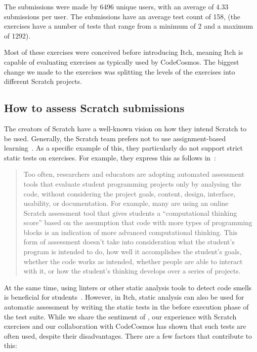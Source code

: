 \documentclass[../main]{subfiles}
\begin{document}
The submissions were made by \num{6496} unique users, with an average of \num{4.33} submissions per user.
The submissions have an average test count of \num{158}, (the exercises have a number of tests that range from a minimum of \num{2} and a maximum of \num{1292}).

Most of these exercises were conceived before introducing Itch, meaning Itch is capable of evaluating exercises as typically used by CodeCosmos.
The biggest change we made to the exercises was splitting the levels of the exercises into different Scratch projects.

\subsection{How to assess Scratch submissions}\label{subsec:how-to-evaluate-scratch-submissions}

The creators of Scratch have a well-known vision on how they intend Scratch to be used.
Generally, the Scratch team prefers not to use assignment-based learning~\autocite{resnickCodingCrossroads2020}.
As a specific example of this, they particularly do not support strict static tests on exercises.
For example, they express this as follows in~\autocite{resnickCodingCrossroads2020}:

\begin{quotation}
    Too often, researchers and educators are adopting automated assessment tools that evaluate student programming projects only by analysing the code, without considering the project goals, content, design, interface, usability, or documentation.
    For example, many are using an online Scratch assessment tool that gives students a ``computational thinking score'' based on the assumption that code with more types of programming blocks is an indication of more advanced computational thinking.
    This form of assessment doesn't take into consideration what the student's program is intended to do, how well it accomplishes the student's goals, whether the code works as intended, whether people are able to interact with it, or how the student's thinking develops over a series of projects.
\end{quotation}

At the same time, using linters or other static analysis tools to detect code smells is beneficial for students~\autocite{hermansCodeSmellsHamper2016}.
However, in Itch, static analysis can also be used for automatic assessment by writing the static tests in the before execution phase of the test suite.
While we share the sentiment of \citeauthor{resnickCodingCrossroads2020}, our experience with Scratch exercises and our collaboration with CodeCosmos has shown that such tests are often used, despite their disadvantages.
There are a few factors that contribute to this:
\end{document}
